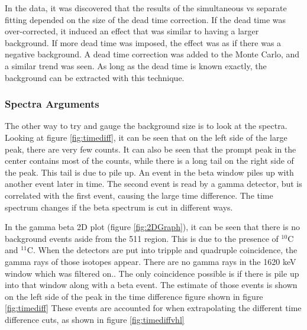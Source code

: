 \documentclass[MaxHughesThesis.tex]{subfiles}
\begin{document}
In the data, it was discovered that the results of the simultaneous vs separate fitting depended on the size of the dead time correction.
If the dead time was over-corrected, it induced an effect that was similar to having a larger background.
If more dead time was imposed, the effect was as if there was a negative background.
A dead time correction was added to the Monte Carlo, and a similar trend was seen.
As long as the dead time is known exactly, the background can be extracted with this technique. 

\subsubsection{Spectra Arguments}
The other way to try and gauge the background size is to look at the spectra.
Looking at figure \ref{fig:timediff}, it can be seen that on the left side of the large peak, there are very few counts.
It can also be seen that the prompt peak in the center contains most of the counts, while there is a long tail on the right side of the peak.
This tail is due to pile up. 
An event in the beta window piles up with another event later in time. 
The second event is read by a gamma detector, but is correlated with the first event, causing the large time difference.
The time spectrum changes if the beta spectrum is cut in different ways.

In the gamma beta 2D plot (figure \ref{fig:2DGraph}), it can be seen that there is no background events aside from the 511 region.
This is due to the presence of $^{10}$C and $^{11}$C.
When the detectors are put into tripple and quadruple coincidence, the gamma rays of those isotopes appear.
There are no gamma rays in the 1620 keV window which was filtered on..
The only coincidence possible is if there is pile up into that window along with a beta event.
The estimate of those events is shown on the left side of the peak in the time difference figure shown in figure \ref{fig:timediff}  
These events are accounted for when extrapolating the different time difference cuts, as shown in figure \ref{fig:timediffvhl}
\end{document}
